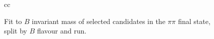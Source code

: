 \begin{figure}[h]
\begin{tabular}{cc}
         \\
    \end{tabular}
    \caption{Fit to $B$ invariant mass of selected candidates in the $\pi\pi$ final state, split by $B$ flavour and run.}
\label{fig:data_fit_pipi}
\end{figure}
